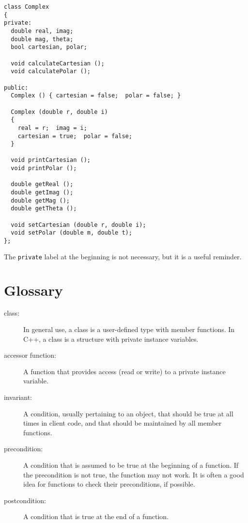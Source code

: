 \begin{lstlisting}
class Complex
{
private:
  double real, imag;
  double mag, theta;
  bool cartesian, polar;

  void calculateCartesian ();
  void calculatePolar ();

public:
  Complex () { cartesian = false;  polar = false; }

  Complex (double r, double i)
  {
    real = r;  imag = i;
    cartesian = true;  polar = false;
  }

  void printCartesian ();
  void printPolar ();

  double getReal ();
  double getImag ();
  double getMag ();
  double getTheta ();

  void setCartesian (double r, double i);
  void setPolar (double m, double t);
};
\end{lstlisting}
%
The {\tt private} label at the beginning is not necessary,
but it is a useful reminder.

\section{Glossary}

\begin{description}

\item[class:]  In general use, a class is a user-defined type
with member functions.  In C++, a class is a structure with
private instance variables.

\item[accessor function:]  A function that provides access
(read or write) to a private instance variable.

\item[invariant:]  A condition, usually pertaining to an object, that
should be true at all times in client code, and that should be
maintained by all member functions.

\item[precondition:]  A condition that is assumed to be true at
the beginning of a function.  If the precondition is not true, the
function may not work.  It is often a good idea for functions to
check their preconditions, if possible.

\item[postcondition:]  A condition that is true at the end of a
function. 


\end{description}

